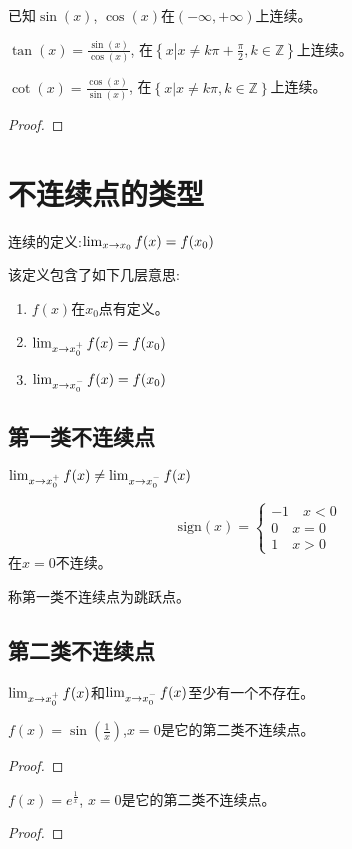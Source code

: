 \begin{proposition}
    已知$\sin(x)$, $\cos(x)$在$(-\infty, +\infty)$上连续。

    $\tan(x) = \frac{\sin(x)}{\cos(x)}$, 在$\left\{ x\left| x \neq k\pi + \frac{\pi}{2}, k \in \mathbb{Z}\right.\right\}$上连续。

    $\cot(x) = \frac{\cos(x)}{\sin(x)}$, 在$\left\{ x\left| x \neq k\pi, k \in \mathbb{Z}\right.\right\}$上连续。
\end{proposition}
\begin{proof}
    
\end{proof}

\section{不连续点的类型}
连续的定义:$\lim_{x \to x_0 } f(x) = f(x_0)$

该定义包含了如下几层意思:
\begin{enumerate}
    \item $f(x)$在$x_0$点有定义。
    \item $\lim_{x \to x_0^+ } f(x) = f(x_0)$ 
    \item $\lim_{x \to x_0^- } f(x) = f(x_0)$
\end{enumerate}
\subsection{第一类不连续点}
$\lim_{x \to x_0^+ } f(x) \neq \lim_{x \to x_0^- } f(x)$
\begin{proposition}
    \begin{equation*}
        \mathrm{sign} (x) = \left\{ 
            \begin{aligned}
                -1 \quad x < 0 \\
                0 \quad x = 0 \\
                1 \quad x > 0 
            \end{aligned}
        \right.
    \end{equation*}
    在$x=0$不连续。
\end{proposition}
称第一类不连续点为跳跃点。
\subsection{第二类不连续点}
$\lim_{x \to x_0^+ } f(x)$和$\lim_{x \to x_0^- } f(x)$至少有一个不存在。
\begin{proposition}
    $f(x) = \sin(\frac{1}{x})$,$x=0$是它的第二类不连续点。
\end{proposition}
\begin{proof}
    
\end{proof}
\begin{proposition}
    $f(x) = e^{\frac{1}{x}}$, $x = 0$是它的第二类不连续点。
\end{proposition}
\begin{proof}
    
\end{proof}
